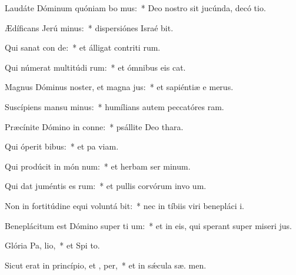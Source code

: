 \item Laudáte Dóminum quóniam bo  mus:~* Deo nostro sit jucúnda, decó tio.
\item Ædíficans Jerú minus:~* dispersiónes Israé bit.
\item Qui sanat con de:~* et álligat contriti rum.
\item Qui númerat multitúdi rum:~* et ómnibus eis  cat.
\item Magnus Dóminus noster, et magna  jus:~* et sapiéntiæ e   merus.
\item Suscípiens mansu minus:~* humílians autem peccatóres   ram.
\item Præcínite Dómino in conne:~* psállite Deo   thara.
\item Qui óperit  bibus:~* et pa  viam.
\item Qui prodúcit in món num:~* et herbam ser minum.
\item Qui dat juméntis es rum:~* et pullis corvórum invo um.
\item Non in fortitúdine equi voluntá bit:~* nec in tíbiis viri benepláci  i.
\item Beneplácitum est Dómino super ti um:~* et in eis, qui sperant super miseri jus.
\item Glória Pa,  lio,~* et Spi to.
\item Sicut erat in princípio, et ,  per,~* et in sǽcula sæ. men.

